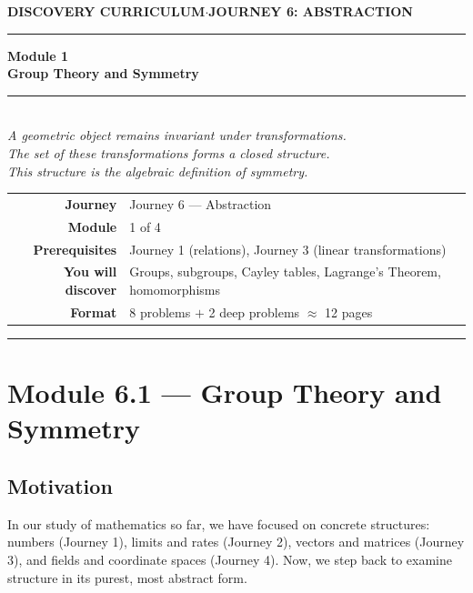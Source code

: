 \documentclass[12pt, a4paper]{article}
\begin{document}
\thispagestyle{empty}
\begin{center}
{\small\color{ModuleColor}\textbf{DISCOVERY CURRICULUM}\quad$\cdot$\quad\textbf{JOURNEY 6: ABSTRACTION}}
\vspace{0.6cm}

{\color{NavyBlue}\rule{\linewidth}{2.5pt}}\vspace{0.5cm}

{\Huge\bfseries\color{NavyBlue}Module 1}\\[0.3cm]
{\LARGE\bfseries\color{ModuleColor}Group Theory and Symmetry}\\[0.4cm]
{\color{PuzzleColor}\rule{0.4\linewidth}{1.5pt}}\\[0.4cm]
{\large\itshape\color{NavyBlue!80}
A geometric object remains invariant under transformations.\\[0.15cm]
The set of these transformations forms a closed structure.\\[0.15cm]
This structure is the algebraic definition of symmetry.}

\vspace{1cm}
\begin{tabular}{rl}
\textbf{Journey}         & Journey 6 --- Abstraction \\[4pt]
\textbf{Module}          & 1 of 4 \\[4pt]
\textbf{Prerequisites}   & Journey 1 (relations), Journey 3 (linear transformations) \\[4pt]
\textbf{You will discover} & Groups, subgroups, Cayley tables, Lagrange's Theorem, homomorphisms \\[4pt]
\textbf{Format}          & 8 problems $+$ 2 deep problems $\approx$ 12 pages \\
\end{tabular}
\vspace{1cm}

{\color{NavyBlue}\rule{\linewidth}{2.5pt}}
\end{center}

\newpage

\section{Module 6.1 --- Group Theory and Symmetry}
\label{sec:mod6.1}

\subsection*{Motivation}

In our study of mathematics so far, we have focused on concrete structures: numbers (Journey 1), limits and rates (Journey 2), vectors and matrices (Journey 3), and fields and coordinate spaces (Journey 4).
Now, we step back to examine structure in its purest, most abstract form.
\end{document}
